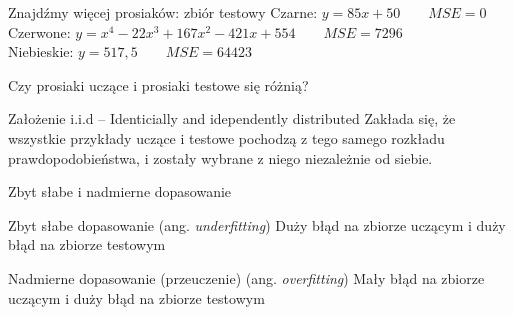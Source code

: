 \documentclass{sa}
\newcommand{\ang}[1]{(ang. \emph{#1})}
\begin{document}
\begin{frame}{Znajdźmy więcej prosiaków: zbiór testowy}
Czarne: $y=85x+50 \qquad MSE=0$ \\
Czerwone: $y=x^4-22x^3+167x^2-421x+554 \qquad MSE=7296$ \\
Niebieskie: $y=517{,}5 \qquad MSE=64423$

\begin{center}
\end{center}
\end{frame}

\begin{frame}{Czy prosiaki uczące i prosiaki testowe się różnią?}
\begin{block}{Założenie i.i.d -- Identicially and idependently distributed}
Zakłada się, że wszystkie przykłady uczące i testowe pochodzą \alert{z tego samego rozkładu prawdopodobieństwa}, i zostały wybrane z niego \alert{niezależnie od siebie}.
\end{block}
\end{frame}

\begin{frame}{Zbyt słabe i nadmierne dopasowanie}
\begin{block}{Zbyt słabe dopasowanie \ang{underfitting}}
Duży błąd na zbiorze uczącym i duży błąd na zbiorze testowym
\end{block}
\vfill
\begin{block}{Nadmierne dopasowanie (przeuczenie) \ang{overfitting}}
Mały błąd na zbiorze uczącym i duży błąd na zbiorze testowym
\end{block}
\end{frame}
\end{document}
